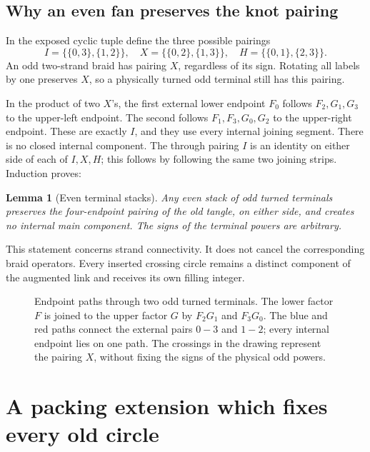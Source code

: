 \documentclass[11pt]{article}
\numberwithin{equation}{section}
\newtheorem{lemma}[theorem]{Lemma}
\theoremstyle{definition}
\begin{document}
\subsection{Why an even fan preserves the knot pairing}

In the exposed cyclic tuple define the three possible pairings
\[
 I=\{\{0,3\},\{1,2\}\},\quad
 X=\{\{0,2\},\{1,3\}\},\quad
 H=\{\{0,1\},\{2,3\}\}.
\]
An odd two-strand braid has pairing \(X\), regardless of its sign.
Rotating all labels by one preserves \(X\), so a physically turned
odd terminal still has this pairing.

In the product of two \(X\)'s, the first external lower endpoint
\(F_0\) follows \(F_2,G_1,G_3\) to the upper-left endpoint.
The second follows \(F_1,F_3,G_0,G_2\) to the upper-right endpoint.
These are exactly \(I\), and they use every internal joining
segment. There is no closed internal component. The through
pairing \(I\) is an identity on either side of each of \(I,X,H\);
this follows by following the same two joining strips.
Induction proves:

\begin{lemma}[Even terminal stacks]\label{td:parity}
Any even stack of odd turned terminals preserves the four-endpoint
pairing of the old tangle, on either side, and creates no internal
main component. The signs of the terminal powers are arbitrary.
\end{lemma}

This statement concerns strand connectivity. It does not cancel
the corresponding braid operators. Every inserted crossing circle
remains a distinct component of the augmented link and receives
its own filling integer.

\begin{figure}[htbp]
\centering

\caption{Endpoint paths through two odd turned terminals. The lower
factor \(F\) is joined to the upper factor \(G\) by
\(F_2G_1\) and \(F_3G_0\). The blue and red paths connect the
external pairs \(0\!-\!3\) and \(1\!-\!2\); every internal endpoint
lies on one path. The crossings in the drawing represent the
pairing \(X\), without fixing the signs of the physical odd powers.}
\label{td:pairing-figure}
\end{figure}

\section{A packing extension which fixes every old circle}
\end{document}
